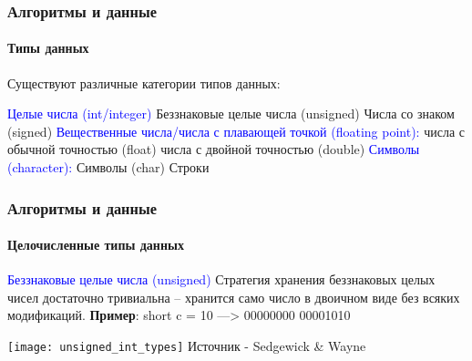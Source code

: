 \documentclass[aspectratio=169]{beamer}
\begin{document}
\begin{frame}
\frametitle{Алгоритмы и данные}
\framesubtitle{Типы данных}
\justifying
\small

Существуют различные категории типов данных:\newline\newline

\textcolor{blue}{Целые числа (int/integer)}\newline
Беззнаковые целые числа (unsigned)\newline
Числа со знаком (signed)\newline\newline
\textcolor{blue}{Вещественные числа/числа с плавающей точкой (floating point):}\newline
числа с обычной точностью (float)\newline
числа с двойной точностью (double)\newline\newline
\textcolor{blue}{Символы (character):}\newline
Символы (char)\newline
Строки
\end{frame}

\begin{frame}
\frametitle{Алгоритмы и данные}
\framesubtitle{Целочисленные типы данных}
\justifying
\small

\textcolor{blue}{Беззнаковые целые числа (unsigned)}\newline\newline
Стратегия хранения беззнаковых целых чисел достаточно тривиальна – хранится само число в двоичном виде без всяких модификаций.\newline\newline
\textbf{Пример}: short c = 10 ---> 00000000 00001010\newline

\centering
\texttt{[image: unsigned\_int\_types]}\newline
\centering
\tiny Источник - Sedgewick \& Wayne
\end{frame}
\end{document}
